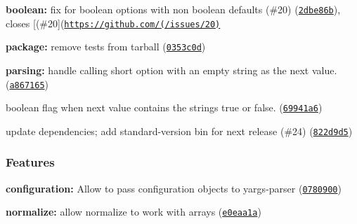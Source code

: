 \begin{DoxyItemize}
\item {\bfseries boolean\+:} fix for boolean options with non boolean defaults (\#20) (\href{https://github.com/yargs/yargs-parser/commit/2dbe86b}{\tt 2dbe86b}), closes \mbox{[}(\#20\mbox{]}(\href{https://github.com/(/issues/20)}{\tt https\+://github.\+com/(/issues/20)}
\item {\bfseries package\+:} remove tests from tarball (\href{https://github.com/yargs/yargs-parser/commit/0353c0d}{\tt 0353c0d})
\item {\bfseries parsing\+:} handle calling short option with an empty string as the next value. (\href{https://github.com/yargs/yargs-parser/commit/a867165}{\tt a867165})
\item boolean flag when next value contains the strings \textquotesingle{}true\textquotesingle{} or \textquotesingle{}false\textquotesingle{}. (\href{https://github.com/yargs/yargs-parser/commit/69941a6}{\tt 69941a6})
\item update dependencies; add standard-\/version bin for next release (\#24) (\href{https://github.com/yargs/yargs-parser/commit/822d9d5}{\tt 822d9d5})
\end{DoxyItemize}

\subsubsection*{Features}


\begin{DoxyItemize}
\item {\bfseries configuration\+:} Allow to pass configuration objects to yargs-\/parser (\href{https://github.com/yargs/yargs-parser/commit/0780900}{\tt 0780900})
\item {\bfseries normalize\+:} allow normalize to work with arrays (\href{https://github.com/yargs/yargs-parser/commit/e0eaa1a}{\tt e0eaa1a}) 
\end{DoxyItemize}